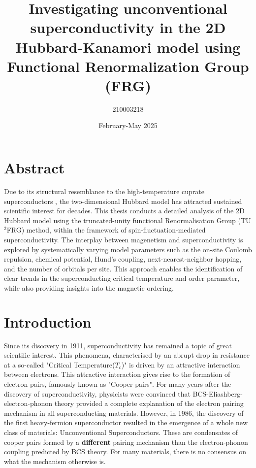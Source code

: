 \documentclass[12pt]{article}
\title{Investigating unconventional superconductivity in the 2D Hubbard-Kanamori model using Functional Renormalization Group (FRG)}
\author{210003218}
\date{February-May 2025}
\begin{document}
\maketitle
\tableofcontents 

\newpage 

\section{Abstract}



Due to its structural resemblance to the high-temperature cuprate superconductors \cite{dagotto1994correlated}, 
the two-dimensional Hubbard model has attracted sustained scientific interest for decades.
This thesis conducts a detailed analysis of the 2D Hubbard model using the truncated-unity functional Renormalisation Group (TU$^2$FRG) method,
within the framework of spin-fluctuation-mediated superconductivity.  The interplay between magenetism and superconductivity is explored 
by systematically varying model parameters such as the on-site Coulomb repulsion, chemical potential, Hund's coupling, next-nearest-neighbor hopping, and the number of orbitals per
site. This approach enables the identification of clear trends in the superconducting critical temperature and order parameter, while also
providing insights into the magnetic ordering. 






\section{Introduction}

Since its discovery in 1911\cite{onnes1911superconductivity}, superconductivity has remained a topic of great scientific interest.
This phenomena, characterised by an abrupt drop in resistance at a so-called "Critical Temperature($T_c$)"\cite{geballe2015tc} is driven by an attractive interaction
between electrons. This attractive interaction gives rise to the formation of electron pairs, famously known as "Cooper pairs"\cite{schrieffer2018theory}. For many 
years after the discovery of superconductivity, physicists
were convinced that BCS-Eliashberg-electron-phonon theory \cite{schrieffer2018theory} provided a complete explanation of the electron pairing mechanism in all superconducting materials. 
However, in 1986, the discovery of the first heavy-fermion superconductor\cite{bednorz1986possible} resulted in the emergence of a whole new class of materials: Unconventional Superconductors. 
These are condensates of cooper pairs formed by a \textbf{different} pairing mechanism than the electron-phonon coupling predicted by BCS theory\cite{hirsch2015superconducting}.
For many materials, there is no consensus on what the mechanism otherwise is. \par 
\medskip
\end{document}
